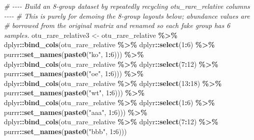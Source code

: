 \documentclass[
]{book}
\newenvironment{Shaded}{\begin{snugshade}}{\end{snugshade}}
\newcommand{\CommentTok}[1]{\textcolor[rgb]{0.56,0.35,0.01}{\textit{#1}}}
\newcommand{\DecValTok}[1]{\textcolor[rgb]{0.00,0.00,0.81}{#1}}
\newcommand{\FunctionTok}[1]{\textcolor[rgb]{0.13,0.29,0.53}{\textbf{#1}}}
\newcommand{\NormalTok}[1]{#1}
\newcommand{\OtherTok}[1]{\textcolor[rgb]{0.56,0.35,0.01}{#1}}
\newcommand{\SpecialCharTok}[1]{\textcolor[rgb]{0.81,0.36,0.00}{\textbf{#1}}}
\newcommand{\StringTok}[1]{\textcolor[rgb]{0.31,0.60,0.02}{#1}}
\begin{document}
\begin{Shaded}
\begin{Highlighting}[]
\CommentTok{\# {-}{-}{-}{-} Build an 8{-}group dataset by repeatedly recycling otu\_rare\_relative columns {-}{-}{-}{-}}
\CommentTok{\# This is purely for demoing the 8{-}group layouts below; abundance values are}
\CommentTok{\# borrowed from the original matrix and renamed so each fake group has 6 samples.}
\NormalTok{otu\_rare\_relative3 }\OtherTok{\textless{}{-}}\NormalTok{ otu\_rare\_relative }\SpecialCharTok{\%\textgreater{}\%}
\NormalTok{  dplyr}\SpecialCharTok{::}\FunctionTok{bind\_cols}\NormalTok{(otu\_rare\_relative }\SpecialCharTok{\%\textgreater{}\%}\NormalTok{ dplyr}\SpecialCharTok{::}\FunctionTok{select}\NormalTok{(}\DecValTok{1}\SpecialCharTok{:}\DecValTok{6}\NormalTok{)   }\SpecialCharTok{\%\textgreater{}\%}\NormalTok{ purrr}\SpecialCharTok{::}\FunctionTok{set\_names}\NormalTok{(}\FunctionTok{paste0}\NormalTok{(}\StringTok{"ko"}\NormalTok{,  }\DecValTok{1}\SpecialCharTok{:}\DecValTok{6}\NormalTok{))) }\SpecialCharTok{\%\textgreater{}\%}
\NormalTok{  dplyr}\SpecialCharTok{::}\FunctionTok{bind\_cols}\NormalTok{(otu\_rare\_relative }\SpecialCharTok{\%\textgreater{}\%}\NormalTok{ dplyr}\SpecialCharTok{::}\FunctionTok{select}\NormalTok{(}\DecValTok{7}\SpecialCharTok{:}\DecValTok{12}\NormalTok{)  }\SpecialCharTok{\%\textgreater{}\%}\NormalTok{ purrr}\SpecialCharTok{::}\FunctionTok{set\_names}\NormalTok{(}\FunctionTok{paste0}\NormalTok{(}\StringTok{"oe"}\NormalTok{,  }\DecValTok{1}\SpecialCharTok{:}\DecValTok{6}\NormalTok{))) }\SpecialCharTok{\%\textgreater{}\%}
\NormalTok{  dplyr}\SpecialCharTok{::}\FunctionTok{bind\_cols}\NormalTok{(otu\_rare\_relative }\SpecialCharTok{\%\textgreater{}\%}\NormalTok{ dplyr}\SpecialCharTok{::}\FunctionTok{select}\NormalTok{(}\DecValTok{13}\SpecialCharTok{:}\DecValTok{18}\NormalTok{) }\SpecialCharTok{\%\textgreater{}\%}\NormalTok{ purrr}\SpecialCharTok{::}\FunctionTok{set\_names}\NormalTok{(}\FunctionTok{paste0}\NormalTok{(}\StringTok{"wt"}\NormalTok{,  }\DecValTok{1}\SpecialCharTok{:}\DecValTok{6}\NormalTok{))) }\SpecialCharTok{\%\textgreater{}\%}
\NormalTok{  dplyr}\SpecialCharTok{::}\FunctionTok{bind\_cols}\NormalTok{(otu\_rare\_relative }\SpecialCharTok{\%\textgreater{}\%}\NormalTok{ dplyr}\SpecialCharTok{::}\FunctionTok{select}\NormalTok{(}\DecValTok{1}\SpecialCharTok{:}\DecValTok{6}\NormalTok{)   }\SpecialCharTok{\%\textgreater{}\%}\NormalTok{ purrr}\SpecialCharTok{::}\FunctionTok{set\_names}\NormalTok{(}\FunctionTok{paste0}\NormalTok{(}\StringTok{"aaa"}\NormalTok{, }\DecValTok{1}\SpecialCharTok{:}\DecValTok{6}\NormalTok{))) }\SpecialCharTok{\%\textgreater{}\%}
\NormalTok{  dplyr}\SpecialCharTok{::}\FunctionTok{bind\_cols}\NormalTok{(otu\_rare\_relative }\SpecialCharTok{\%\textgreater{}\%}\NormalTok{ dplyr}\SpecialCharTok{::}\FunctionTok{select}\NormalTok{(}\DecValTok{7}\SpecialCharTok{:}\DecValTok{12}\NormalTok{)  }\SpecialCharTok{\%\textgreater{}\%}\NormalTok{ purrr}\SpecialCharTok{::}\FunctionTok{set\_names}\NormalTok{(}\FunctionTok{paste0}\NormalTok{(}\StringTok{"bbb"}\NormalTok{, }\DecValTok{1}\SpecialCharTok{:}\DecValTok{6}\NormalTok{)))}


\end{Highlighting}
\end{Shaded}
\end{document}
